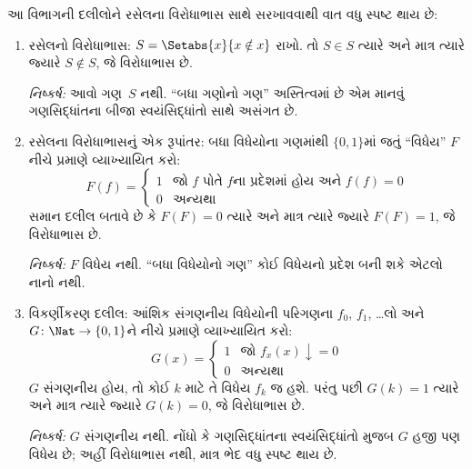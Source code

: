 \begingroup
\makeatletter{}\makeatother

\label{guunit:OLP-0236}


આ વિભાગની દલીલોને રસેલના વિરોધાભાસ સાથે સરખાવવાથી વાત વધુ
સ્પષ્ટ થાય છે:
\begin{enumerate}
\item રસેલનો વિરોધાભાસ: $S = \Setabs{x}{x \notin x}$ રાખો. તો
  $S \in S$ ત્યારે અને માત્ર ત્યારે જ્યારે $S \notin S$,
  જે વિરોધાભાસ છે.

  \emph{નિષ્કર્ષ:} આવો ગણ~$S$ નથી. ``બધા ગણોનો ગણ'' અસ્તિત્વમાં
  છે એમ માનવું ગણસિદ્ધાંતના બીજા સ્વયંસિદ્ધાંતો સાથે અસંગત છે.

\item રસેલના વિરોધાભાસનું એક રૂપાંતર: બધા વિધેયોના ગણમાંથી
  $\{ 0, 1 \}$માં જતું ``વિધેય'' $F$ નીચે પ્રમાણે વ્યાખ્યાયિત કરો:
  \[
  F(f) =
  \begin{cases}
    1 & \text{જો $f$ પોતે $f$ના પ્રદેશમાં હોય અને $f(f) = 0$} \\
    0 & \text{અન્યથા}
  \end{cases}
  \]
  સમાન દલીલ બતાવે છે કે $F(F) = 0$ ત્યારે અને માત્ર ત્યારે જ્યારે
  $F(F) = 1$, જે વિરોધાભાસ છે.

  \emph{નિષ્કર્ષ:} $F$ વિધેય નથી. ``બધા વિધેયોનો ગણ'' કોઈ વિધેયનો
  પ્રદેશ બની શકે એટલો નાનો નથી.

\item વિકર્ણીકરણ દલીલ: આંશિક સંગણનીય વિધેયોની પરિગણના
  $f_0$, $f_1$, \dots લો અને $G \colon \Nat \to
  \{ 0, 1 \}$ને નીચે પ્રમાણે વ્યાખ્યાયિત કરો:
  \[
  G(x) =
  \begin{cases}
    1 & \text{જો $f_x(x)\downarrow = 0$} \\
    0 & \text{અન્યથા}
  \end{cases}
  \]
  $G$ સંગણનીય હોય, તો કોઈ $k$ માટે તે વિધેય $f_k$ જ હશે.
  પરંતુ પછી $G(k) = 1$ ત્યારે અને માત્ર ત્યારે જ્યારે $G(k) = 0$,
  જે વિરોધાભાસ છે.

  \emph{નિષ્કર્ષ:} $G$ સંગણનીય નથી. નોંધો કે ગણસિદ્ધાંતના
  સ્વયંસિદ્ધાંતો મુજબ $G$ હજી પણ વિધેય છે; અહીં વિરોધાભાસ
  નથી, માત્ર ભેદ વધુ સ્પષ્ટ થાય છે.
\end{enumerate}

